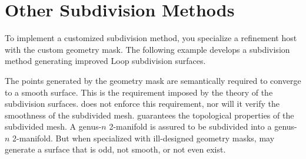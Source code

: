 \section{Other Subdivision Methods}
To implement a customized subdivision method, you 
specialize a refinement host 
with the custom geometry mask. 
The following example develops a subdivision method
generating improved Loop subdivision surfaces. 


The points generated by the geometry mask are semantically
required to converge to a smooth surface. This is the requirement
imposed by the theory of the subdivision surfaces.
 does not enforce this requirement, nor will
it verify the smoothness of the subdivided mesh. 
 guarantees the topological properties of 
the subdivided mesh. A genus-$n$ 2-manifold is assured to be subdivided
into a genus-$n$ 2-manifold. But when specialized with ill-designed
geometry masks,  may generate a surface that is 
odd, not smooth, or not even exist.


